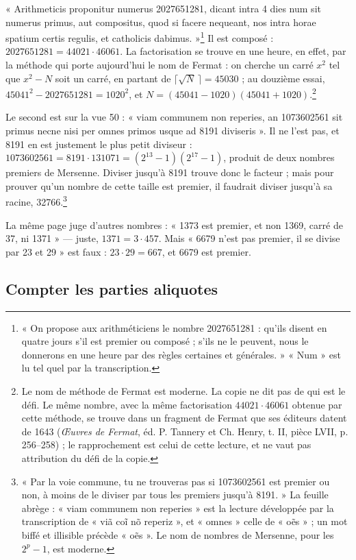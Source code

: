 \documentclass[11pt,a4paper]{article}
\begin{document}
« Arithmeticis proponitur numerus 2027651281, dicant intra 4 dies num sit
numerus primus, aut compositus, quod si facere nequeant, nos intra horae spatium
certis regulis, et catholicis dabimus. »\footnote{« On propose aux arithméticiens
le nombre 2027651281 : qu'ils disent en quatre jours s'il est premier ou composé ;
s'ils ne le peuvent, nous le donnerons en une heure par des règles certaines et
générales. » « Num » est lu tel quel par la transcription.} Il est composé :
$2027651281 = 44021 \cdot 46061$. La factorisation se trouve en une heure, en
effet, par la méthode qui porte aujourd'hui le nom de Fermat : on cherche un
carré $x^2$ tel que $x^2 - N$ soit un carré, en partant de $\lceil\sqrt N\,\rceil
= 45030$ ; au douzième essai, $45041^2 - 2027651281 = 1020^2$, et
$N = (45041 - 1020)(45041 + 1020)$.\footnote{Le nom de méthode de Fermat est
moderne. La copie ne dit pas de qui est le défi. Le même nombre, avec la même
factorisation $44021 \cdot 46061$ obtenue par cette méthode, se trouve dans un
fragment de Fermat que ses éditeurs datent de 1643 (\emph{Œuvres de Fermat},
éd. P. Tannery et Ch. Henry, t. II, pièce LVII, p. 256--258) ; le rapprochement
est celui de cette lecture, et ne vaut pas attribution du défi de la copie.}

Le second est sur la vue 50 : « viam communem non reperies, an 1073602561 sit
primus necne nisi per omnes primos usque ad 8191 diviseris ». Il ne l'est pas, et 8191 en est justement le plus petit
diviseur : $1073602561 = 8191 \cdot 131071 = (2^{13} - 1)(2^{17} - 1)$, produit de
deux nombres premiers de Mersenne. Diviser jusqu'à 8191 trouve donc le facteur ;
mais pour prouver qu'un nombre de cette taille est premier, il faudrait
diviser jusqu'à sa racine, 32766.\footnote{« Par la voie commune, tu ne
trouveras pas si 1073602561 est premier ou non, à moins de le diviser par tous
les premiers jusqu'à 8191. » La feuille abrège : « viam communem non reperies »
est la lecture développée par la transcription de « viã coĩ nõ reperiz », et
« omnes » celle de « oẽs » ; un mot biffé et illisible précède « oẽs ». Le nom de
nombres de Mersenne, pour les $2^p - 1$, est moderne.}

La même page juge d'autres nombres : « 1373 est premier, et non 1369, carré de
37, ni 1371 » — juste, $1371 = 3 \cdot 457$. Mais « 6679 n'est pas premier, il se
divise par 23 et 29 » est faux : $23 \cdot 29 = 667$, et 6679 est premier.

\subsection*{Compter les parties aliquotes}
\end{document}
